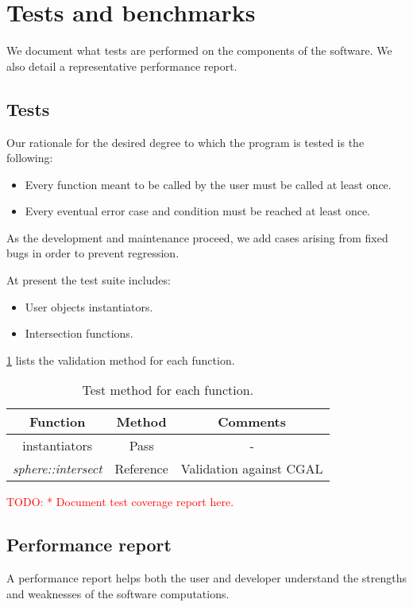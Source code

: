 \section{Tests and benchmarks}
We document what tests are performed on the components of the software.
We also detail a representative performance report.

\subsection{Tests}
Our rationale for the desired degree to which the program is tested is the
following:

\begin{itemize}
\item Every function meant to be called by the user must be called at least
      once.
\item Every eventual error case and condition must be reached at least once.
\end{itemize}

As the development and maintenance proceed, we add cases arising from fixed
bugs in order to prevent regression.

At present the test suite includes:

\begin{itemize}
\item User objects instantiators.
\item Intersection functions.
\end{itemize}

\cref{tab:test-method} lists the validation method for each function.

\begin{table} \caption{\label{tab:test-method} Test method for each function.}
\begin{tabular}{| c | c | c |} \hline
Function & Method & Comments \\ \hline
instantiators & Pass & - \\ \hline
\textit{sphere::intersect} & Reference & Validation against CGAL \\
\hline \end{tabular} \end{table}

\textcolor{red}{TODO: * Document test coverage report here.}

\subsection{Performance report}
A performance report helps both the user and developer understand the strengths
and weaknesses of the software computations.

